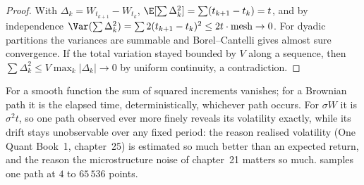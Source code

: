 \begin{proof}
With $\Delta_k = W_{t_{k+1}} - W_{t_k}$, $\E[\sum\Delta_k^2] = \sum(t_{k+1} - t_k) = t$, and by
independence $\Var(\sum\Delta_k^2) = \sum 2(t_{k+1} - t_k)^2 \le 2t\cdot\text{mesh} \to 0$. For
dyadic partitions the variances are summable and Borel--Cantelli gives almost sure
convergence. If the total variation stayed bounded by $V$ along a sequence, then $\sum\Delta_k^2
\le V\max_k|\Delta_k| \to 0$ by uniform continuity, a contradiction.
\end{proof}

For a smooth function the sum of squared increments vanishes; for a Brownian path it is the
elapsed time, deterministically, whichever path occurs. For $\sigma W$ it is $\sigma^2 t$, so
one path observed ever more finely reveals its volatility exactly, while its drift stays
unobservable over any fixed period: the reason realised volatility (One Quant Book~1,
chapter~25) is estimated so much better than an expected return, and the reason the
microstructure noise of chapter~21 matters so much. 
samples one path at $4$ to $65\,536$ points.

\begin{omfigure}

\label{fig:qm:brownian-motion:qv}
\end{omfigure}

